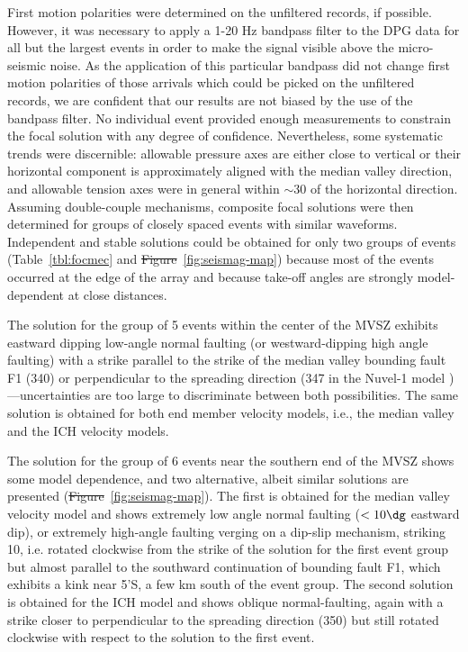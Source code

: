 \documentclass[jgrga]{agu2001} %
\newlength{\tw}
\providecommand{\DIFadd}[1]{{\protect\color{blue}\uwave{#1}}} %
\providecommand{\DIFdel}[1]{{\protect\color{red}\sout{#1}}}                      %
\providecommand{\DIFaddbegin}{} %
\providecommand{\DIFaddend}{} %
\providecommand{\DIFdelbegin}{} %
\providecommand{\DIFdelend}{} %
\begin{document}
\begin{article}
First motion polarities were determined on the unfiltered records, if
possible.  However, it was necessary to apply a 1-20 Hz bandpass
filter to the DPG data for
all but the largest events in order to make the signal visible above
the micro-seismic noise. As the application of this particular bandpass did not
change first motion polarities of those arrivals which could be picked on
the unfiltered records, we are confident that our results are not
biased by the use of the bandpass filter.  
No individual event provided enough measurements to constrain the
focal solution with any degree of confidence. Nevertheless, some
systematic trends were discernible:  allowable pressure
axes are either close to vertical or their horizontal component is approximately aligned with the
median valley direction, and allowable tension axes were in general within
$\sim$30{\dg} of the horizontal direction.  Assuming double-couple
mechanisms, composite focal solutions
were then determined for groups of closely spaced events with similar
waveforms.   Independent and stable solutions could be obtained for
only two groups of events (Table~\ref{tbl:focmec} and \DIFdelbegin \DIFdel{Figure}\DIFdelend \DIFaddbegin \DIFadd{Plate}\DIFaddend ~\ref{fig:seismag-map})
because most of the events occurred at the edge of the array and
because take-off angles are strongly
model-dependent at close distances.

The solution for the group of 5 events within the center of the
MVSZ exhibits eastward dipping low-angle normal
faulting (or westward-dipping high angle faulting)
with a strike parallel to the strike of the median valley bounding
fault F1 (340\dg) or perpendicular to the spreading direction (347{\dg} in
the Nuvel-1 model \citep{demets90})---uncertainties are too large to
discriminate between both possibilities.
The same solution is obtained for both end member velocity models,
i.e., the median valley and the ICH velocity models.

The solution for the group of 6 events near the southern end of
the MVSZ shows some model dependence, and two alternative, albeit similar
solutions are presented (\DIFdelbegin \DIFdel{Figure}\DIFdelend \DIFaddbegin \DIFadd{Plate}\DIFaddend ~\ref{fig:seismag-map}).  The first is obtained for the median valley
velocity model and shows extremely low angle normal faulting ($<10\dg$
eastward dip), or extremely high-angle faulting verging on a dip-slip
mechanism, striking 10\dg, i.e. rotated clockwise from the strike of
the solution for the first event group but almost parallel to the southward continuation
of bounding fault F1, which exhibits a kink near 5'S,  a few km south of the
event group.  The second solution is obtained for the ICH model and
shows oblique normal-faulting, again with a strike closer to
perpendicular to the spreading direction (350\dg) but still rotated
clockwise with respect to the  solution to the first event.


\end{article}
\end{document}
